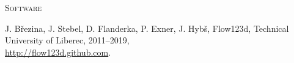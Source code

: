 \documentclass[bibliography=totocnumbered,dvipsnames,FM,Dis, EN]{tulthesis_autoreferat}
\begin{document}
\begin{itemize}[label={}, leftmargin=*]
% 
% 
% 
\end{itemize}
%
\vspace{0.5cm}
%
{\noindent\large\textsc{Software}}
\begin{itemize}[label={}, leftmargin=*]
{\small
\item
J. B{\v r}ezina, J. Stebel, D. Flanderka, P. Exner, J. Hyb{\v s}, Flow123d, 
Technical University of Liberec, 2011--2019, \\
\href{http://flow123d.github.com}{http://flow123d.github.com}.
}
\end{itemize}
%
\end{document}

